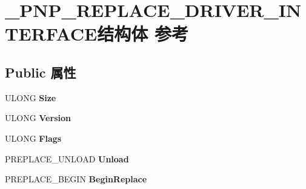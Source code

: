 \hypertarget{struct___p_n_p___r_e_p_l_a_c_e___d_r_i_v_e_r___i_n_t_e_r_f_a_c_e}{}\section{\+\_\+\+P\+N\+P\+\_\+\+R\+E\+P\+L\+A\+C\+E\+\_\+\+D\+R\+I\+V\+E\+R\+\_\+\+I\+N\+T\+E\+R\+F\+A\+C\+E结构体 参考}
\label{struct___p_n_p___r_e_p_l_a_c_e___d_r_i_v_e_r___i_n_t_e_r_f_a_c_e}
\subsection*{Public 属性}
\begin{DoxyCompactItemize}
\item 
\mbox{\label{struct___p_n_p___r_e_p_l_a_c_e___d_r_i_v_e_r___i_n_t_e_r_f_a_c_e_aad0be5775e7935b804b8b1ae026e4330}} 
U\+L\+O\+NG {\bfseries Size}
\item 
\mbox{\label{struct___p_n_p___r_e_p_l_a_c_e___d_r_i_v_e_r___i_n_t_e_r_f_a_c_e_a636554679ca38c7f9ba0415b39d259dc}} 
U\+L\+O\+NG {\bfseries Version}
\item 
\mbox{\label{struct___p_n_p___r_e_p_l_a_c_e___d_r_i_v_e_r___i_n_t_e_r_f_a_c_e_a7c10f7eb886cfd64348ae0a69b8b8f33}} 
U\+L\+O\+NG {\bfseries Flags}
\item 
\mbox{\label{struct___p_n_p___r_e_p_l_a_c_e___d_r_i_v_e_r___i_n_t_e_r_f_a_c_e_ae76d5a276fb706af1ba005a36254a8c7}} 
P\+R\+E\+P\+L\+A\+C\+E\+\_\+\+U\+N\+L\+O\+AD {\bfseries Unload}
\item 
\mbox{\label{struct___p_n_p___r_e_p_l_a_c_e___d_r_i_v_e_r___i_n_t_e_r_f_a_c_e_ad13e30c824501fc3605d465d8c439fce}} 
P\+R\+E\+P\+L\+A\+C\+E\+\_\+\+B\+E\+G\+IN {\bfseries Begin\+Replace}
\item 
\mbox{\label{struct___p_n_p___r_e_p_l_a_c_e___d_r_i_v_e_r___i_n_t_e_r_f_a_c_e_ac7b58d894becae9862460e64e35d1f63}} 

\end{DoxyCompactItemize}
